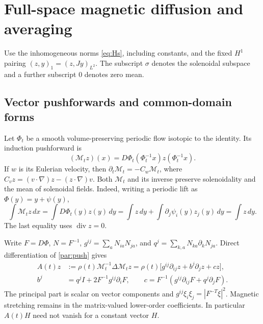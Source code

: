\documentclass[11pt,a4paper]{amsart}
\theoremstyle{definition}
\theoremstyle{remark}
\numberwithin{equation}{section}
\begin{document}
\section{Full-space magnetic diffusion and averaging}
\label{par:section}\label{sec:parabolic}

Use the inhomogeneous norms \eqref{eq:Hs}, including constants, and the fixed $H^1$ pairing $(z,y)_1=(z,Jy)_{L^2}$. The subscript $\sigma$ denotes the solenoidal subspace and a further subscript $0$ denotes zero mean.

\subsection{Vector pushforwards and common-domain forms}
\label{par:forms}

Let $\Phi_t$ be a smooth volume-preserving periodic flow isotopic to the
identity. Its induction pushforward is
\begin{equation}\label{par:push}
 (\mathcal M_tz)(x)=D\Phi_t(\Phi_t^{-1}x)z(\Phi_t^{-1}x).
\end{equation}
If $w$ is its Eulerian velocity, then
$\partial_t\mathcal M_t=-C_w\mathcal M_t$, where
$C_vz=(v\cdot\nabla)z-(z\cdot\nabla)v$. Both $\mathcal M_t$ and its inverse
preserve solenoidality and the mean of solenoidal fields. Indeed, writing a
periodic lift as $\Phi(y)=y+\psi(y)$,
\begin{equation}\label{par:mean}
 \int\mathcal M_tz\,dx
 =\int D\Phi_t(y)z(y)\,dy
 =\int z\,dy+\int\partial_j\psi_i(y)z_j(y)\,dy
 =\int z\,dy.
\end{equation}
The last equality uses $\operatorname{div}z=0$.

Write $F=D\Phi$, $N=F^{-1}$,
$g^{ij}=\sum_aN_{ia}N_{ja}$, and
$q^j=\sum_{k,a}N_{ka}\partial_kN_{ja}$. Direct differentiation of
\eqref{par:push} gives
\begin{align}
 A(t)z&:=\rho(t)\mathcal M_t^{-1}\Delta\mathcal M_tz
 =\rho(t)\bigl[g^{ij}\partial_{ij}z+b^j\partial_jz+cz\bigr],
 \label{par:operator}\\
 b^j&=q^jI+2F^{-1}g^{ij}\partial_iF,
 \qquad
 c=F^{-1}(g^{ij}\partial_{ij}F+q^j\partial_jF).
 \label{par:lowercoeff}
\end{align}
The principal part is scalar on vector components and
$g^{ij}\xi_i\xi_j=|F^{-T}\xi|^2$. Magnetic stretching remains in the
matrix-valued lower-order coefficients. In particular $A(t)H$ need not vanish
for a constant vector $H$.
\end{document}
